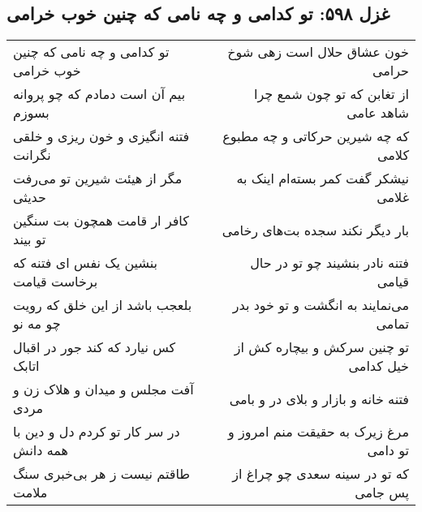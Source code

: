 \begin{center}
\section*{غزل ۵۹۸: تو کدامی و چه نامی که چنین خوب خرامی}
\label{sec:598}
\begin{longtable}{l p{0.5cm} r}
تو کدامی و چه نامی که چنین خوب خرامی
&&
خون عشاق حلال است زهی شوخ حرامی
\\
بیم آن است دمادم که چو پروانه بسوزم
&&
از تغابن که تو چون شمع چرا شاهد عامی
\\
فتنه انگیزی و خون ریزی و خلقی نگرانت
&&
که چه شیرین حرکاتی و چه مطبوع کلامی
\\
مگر از هیئت شیرین تو می‌رفت حدیثی
&&
نیشکر گفت کمر بسته‌ام اینک به غلامی
\\
کافر ار قامت همچون بت سنگین تو بیند
&&
بار دیگر نکند سجده بت‌های رخامی
\\
بنشین یک نفس ای فتنه که برخاست قیامت
&&
فتنه نادر بنشیند چو تو در حال قیامی
\\
بلعجب باشد از این خلق که رویت چو مه نو
&&
می‌نمایند به انگشت و تو خود بدر تمامی
\\
کس نیارد که کند جور در اقبال اتابک
&&
تو چنین سرکش و بیچاره کش از خیل کدامی
\\
آفت مجلس و میدان و هلاک زن و مردی
&&
فتنه خانه و بازار و بلای در و بامی
\\
در سر کار تو کردم دل و دین با همه دانش
&&
مرغ زیرک به حقیقت منم امروز و تو دامی
\\
طاقتم نیست ز هر بی‌خبری سنگ ملامت
&&
که تو در سینه سعدی چو چراغ از پس جامی
\\
\end{longtable}
\end{center}

